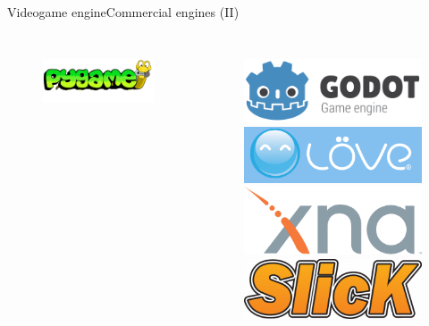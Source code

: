 \documentclass[10pt,compress]{beamer} %
\begin{document}
\begin{frame}{Videogame engine}{Commercial engines (II)}
\begin{columns}
\begin{figure}[t]
\begin{center}
			\bigskip
		    \includegraphics[width=0.8\linewidth]{figs/pygame_logo}\\
		\end{center}
   	 	\end{figure}
		\vspace{-1cm}
   	 	\begin{figure}[t]
		\begin{center}
		    \includegraphics[width=0.6\linewidth]{figs/godot}\\
			\medskip
		    \includegraphics[width=0.8\linewidth]{figs/love}\\
			\medskip
		    \includegraphics[width=0.8\linewidth]{figs/xna}\\
			\medskip
		    \includegraphics[width=0.8\linewidth]{figs/slick2d}\\
		\end{center}
   	 	\end{figure}
	\end{columns}
\end{frame}
\end{document}
